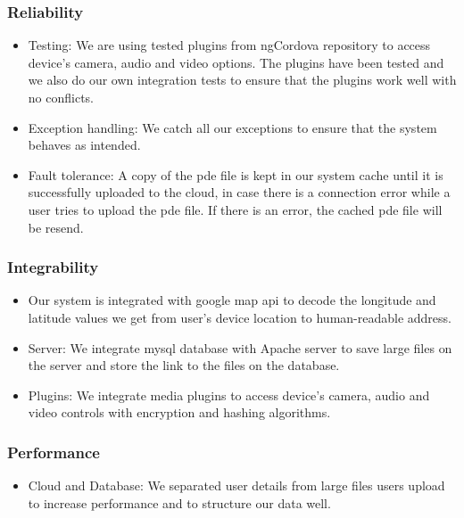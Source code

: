 \documentclass[a4paper,12pt]{article}
\begin{document}
\subsubsection{Reliability}
	\begin{itemize}
		\item Testing: We are using tested plugins from ngCordova repository to access device's camera, audio and video options. The plugins have been tested and we also do our own integration tests to ensure that the plugins work well with no conflicts.
		\item Exception handling: We catch all our exceptions to ensure that the system behaves as intended.
		\item Fault tolerance: A copy of the pde file is kept in our system cache until it is successfully uploaded to the cloud, in case there is a connection error while a user tries to upload the pde file. If there is an error, the cached pde file will be resend.  
	\end{itemize}
\subsubsection{Integrability}
	\begin{itemize}
		\item Our system is integrated with google map api to decode the longitude and latitude values we get from user's device location to human-readable address.
		\item Server: We integrate mysql database with Apache server to save large files on the server and store the link to the files on the database.
		\item Plugins: We integrate media plugins to access device's camera, audio and video controls with encryption and hashing algorithms. 
	\end{itemize}
\subsubsection{Performance}
	\begin{itemize}
		\item Cloud and Database: We separated user details from large files users upload to increase performance and to structure our data well.
	\end{itemize}
\end{document}
